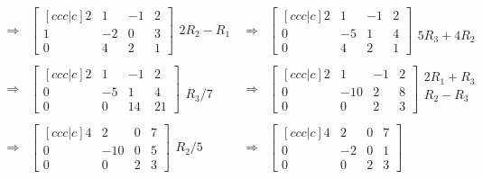 \documentclass[10pt]{article}
\begin{document}
$$\begin{array}{rlcl}
\Rightarrow&
 \begin{bmatrix}[ccc|c] 2&1&-1&2\\1&-2&0&3\\0&4&2&1\end{bmatrix}
  \begin{array}{lr} \ \\2R_2-R_1\\ \ \end{array}
&\Rightarrow& 
\begin{bmatrix}[ccc|c] 2&1&-1&2\\0&-5&1&4\\0&4&2&1\end{bmatrix} 
\begin{array}{lr}\ \\ \ \\5R_3+4R_2 \end{array}
\\ \\ \Rightarrow&
 \begin{bmatrix}[ccc|c] 2&1&-1&2\\0&-5&1&4\\0&0&14&21\end{bmatrix} 
 \begin{array}{lr}\ \\ \ \\R_3/7 \end{array}
&\Rightarrow& 
\begin{bmatrix}[ccc|c] 2&1&-1&2\\0&-10&2&8\\0&0&2&3\end{bmatrix} 
\begin{array}{l} 2R_1+R_3\\R_2-R_3\\ \ \end{array}
\\ \\ \Rightarrow&
 \begin{bmatrix}[ccc|c] 4&2&0&7\\0&-10&0&5\\0&0&2&3\end{bmatrix}  
 \begin{array}{lr}\ \\R_2/5\\ \ \end{array} 
&\Rightarrow& 
\begin{bmatrix}[ccc|c] 4&2&0&7\\0&-2&0&1\\0&0&2&3\end{bmatrix}  

\end{array}$$
\end{document}
